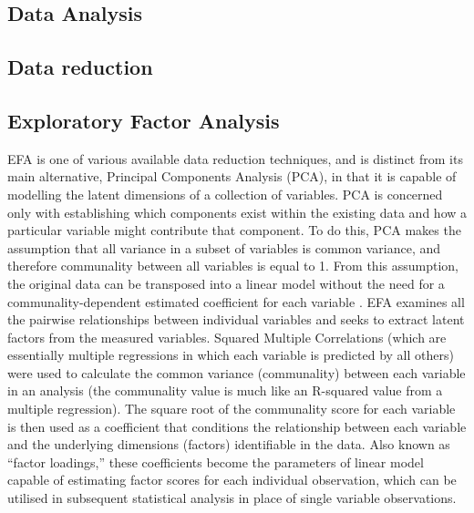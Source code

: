 \begin{CJK}{UTF8}{gbsn}
\section{Data Analysis\label{app8:dataAnalysis}}




\subsection{Data reduction\label{app8:dataReduction}}


\subsection{Exploratory Factor Analysis\label{app8:EFA}}
EFA is one of various available data reduction techniques, and is distinct from its main alternative, Principal Components Analysis (PCA), in that it is capable of modelling the latent dimensions of a collection of variables. PCA is concerned only with establishing which components exist within the existing data and how a particular variable might contribute that component. To do this, PCA makes the assumption that all variance in a subset of variables is common variance, and therefore communality between all variables is equal to 1. From this assumption, the original data can be transposed into a linear model without the need for a communality-dependent estimated coefficient for each variable \citep{Widaman2007}. EFA examines all the pairwise relationships between individual variables and seeks to extract latent factors from the measured variables.  Squared Multiple Correlations (which are essentially multiple regressions in which each variable is predicted by all others) were used to calculate the common variance (communality) between each variable in an analysis (the communality value is much like an R-squared value from a multiple regression).
The square root of the communality score for each variable is then used as a coefficient that conditions the relationship between each variable and the underlying dimensions (factors) identifiable in the data. Also known as ``factor loadings,'' these coefficients become the parameters of linear model capable of estimating factor scores for each individual observation, which can be utilised in subsequent statistical analysis in place of single variable observations.


\end{CJK}
